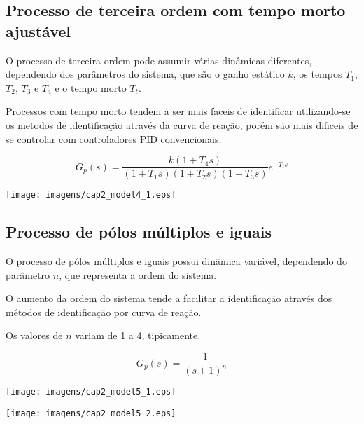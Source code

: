 \subsection{Processo de terceira ordem com tempo morto ajustável}
    
    O processo de terceira ordem pode assumir várias dinâmicas diferentes, dependendo
    dos parâmetros do sistema, que são o ganho estático $k$, os tempos $T_1$, $T_2$,
    $T_3$ e $T_4$ e o tempo morto $T_t$.
    
    Processos com tempo morto tendem a ser mais faceis de identificar utilizando-se
    os metodos de identificação através da curva de reação, porém são mais dificeis
    de se controlar com controladores \acs{PID} convencionais.
    
    \begin{equation}
        G_p(s) = \frac{k(1+T_4 s)}{(1+T_1 s)(1+T_2 s)(1+T_3 s)} e^{-T_t s}
    \end{equation}
    
    \begin{center}
        \texttt{[image: imagens/cap2\_model4\_1.eps]}
    \end{center}

\subsection{Processo de pólos múltiplos e iguais}

    O processo de pólos múltiplos e iguais possui dinâmica variável, dependendo
    do parâmetro $n$, que representa a ordem do sistema.
    
    O aumento da ordem do sistema tende a facilitar a identificação através dos
    métodos de identificação por curva de reação.
    
    Os valores de $n$ variam de 1 a 4, tipicamente.
    
    \begin{equation}
        G_p(s) = \frac{1}{(s+1)^n}
    \end{equation}

    \begin{center}
        \texttt{[image: imagens/cap2\_model5\_1.eps]}
    \end{center}
    
    \begin{center}
        \texttt{[image: imagens/cap2\_model5\_2.eps]}
    \end{center}
    
